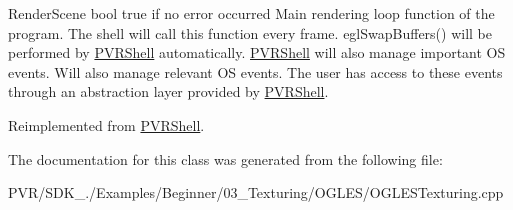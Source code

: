   Render\+Scene  bool true if no error occurred  Main rendering loop function of the program. The shell will call this function every frame. egl\+Swap\+Buffers() will be performed by \hyperlink{class_p_v_r_shell}{P\+V\+R\+Shell} automatically. \hyperlink{class_p_v_r_shell}{P\+V\+R\+Shell} will also manage important O\+S events. Will also manage relevant O\+S events. The user has access to these events through an abstraction layer provided by \hyperlink{class_p_v_r_shell}{P\+V\+R\+Shell}. 

Reimplemented from \hyperlink{class_p_v_r_shell_ae0eb5f797cbe993a22b8659f9c332578}{P\+V\+R\+Shell}.



The documentation for this class was generated from the following file\+:\begin{DoxyCompactItemize}
\item 
P\+V\+R/\+S\+D\+K\+\_./\+Examples/\+Beginner/03\+\_\+\+Texturing/\+O\+G\+L\+E\+S/O\+G\+L\+E\+S\+Texturing.\+cpp\end{DoxyCompactItemize}
